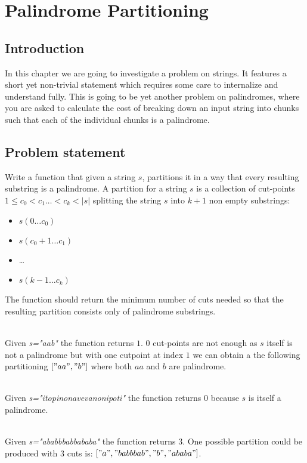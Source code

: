 %

\chapter{Palindrome Partitioning }
\label{ch:palindrome_partitioning2}
\section*{Introduction}
In this chapter we are going to investigate a problem on strings. It features a short yet non-trivial 
statement which requires some care to internalize and understand fully. This is going to be yet another problem on palindromes,
where you are asked to calculate the cost of breaking down an input string into chunks such that each of the individual chunks is a palindrome. 

\section{Problem statement}
\begin{exercise}
Write a function that given a string $s$, partitions it in a way that every resulting substring is a
palindrome. A partition for a string $s$ is a collection of cut-points $1 \leq c_0 < c_1 \ldots <
c_k < |s|$ splitting the string $s$ into $k+1$ non empty substrings:
\begin{itemize}
	\item $s(0 \ldots c_0)$
	\item $s(c_0+1 \ldots c_1)$
	\item \ldots
	\item $s(k-1 \ldots c_k)$
\end{itemize}
The function should return the minimum number of cuts needed so that the resulting partition
consists only of palindrome substrings.

\begin{example}
		\hfill \\
		Given \textit{s="aab"} the function returns $1$. $0$ cut-points are not enough as $s$ itself
		is not a palindrome but with one cutpoint at index $1$ we can obtain a the following
		partitioning $["aa","b"]$ where both $aa$ and $b$ are palindrome. 
	\end{example}

	\begin{example}
		\hfill \\
		Given \textit{s="itopinonavevanonipoti"} the function returns $0$ because $s$ is itself a
		palindrome. 
	\end{example}

	\begin{example}
		\hfill \\
		Given \textit{s="ababbbabbababa"} the function returns $3$. One possible partition could be
		produced with $3$ cuts is: $["a","babbbab","b","ababa"]$.
	\end{example}
\end{exercise}
